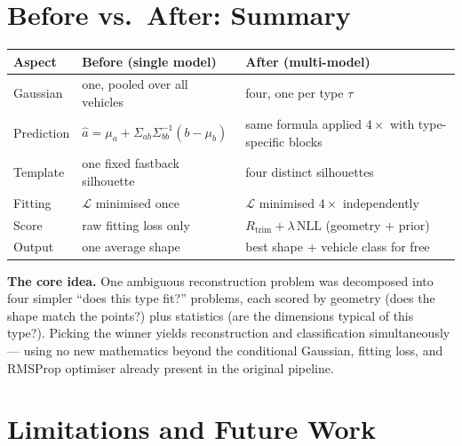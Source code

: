 \documentclass[11pt]{article}
\newcommand{\Rtrim}{R_{\text{trim}}}
\newcommand{\NLL}{\text{NLL}}
\theoremstyle{definition}
\begin{document}
\section{Before vs.\ After: Summary}

\begin{table}[h]
\centering
\renewcommand{\arraystretch}{1.25}
\begin{tabular}{p{3.2cm} p{4.8cm} p{4.8cm}}
\toprule
\textbf{Aspect} & \textbf{Before (single model)} & \textbf{After (multi-model)} \\
\midrule
Gaussian & one, pooled over all vehicles & four, one per type $\tau$ \\
Prediction & $\hat{a}=\mu_a+\Sigma_{ab}\Sigma_{bb}^{-1}(b-\mu_b)$ & same formula applied $4\times$ with type-specific blocks \\
Template & one fixed fastback silhouette & four distinct silhouettes \\
Fitting & $\mathcal{L}$ minimised once & $\mathcal{L}$ minimised $4\times$ independently \\
Score & raw fitting loss only & $\Rtrim + \lambda\,\NLL$ (geometry $+$ prior) \\
Output & one average shape & best shape $+$ vehicle class for free \\
\bottomrule
\end{tabular}
\end{table}

\noindent\textbf{The core idea.} One ambiguous reconstruction problem was decomposed into four simpler ``does this type fit?'' problems, each scored by geometry (does the shape match the points?) plus statistics (are the dimensions typical of this type?). Picking the winner yields reconstruction and classification simultaneously --- using no new mathematics beyond the conditional Gaussian, fitting loss, and RMSProp optimiser already present in the original pipeline.

\section{Limitations and Future Work}
\end{document}
